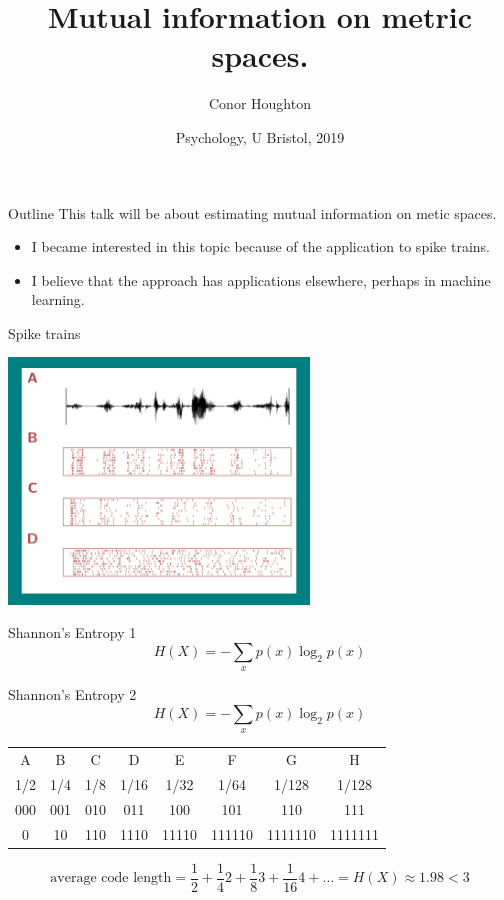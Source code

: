 \documentclass{beamer}
\title[A Kozachenko-Leonenko estimator.]{Mutual information on metric spaces.}
\author{Conor Houghton}
\institute{CS, U Bristol}
\date{Psychology, U Bristol, 2019}
\begin{document}
\maketitle

\begin{frame}{Outline}
This talk will be about estimating mutual information on metic spaces.
\begin{itemize}
\item I became interested in this topic because of the application to spike trains.
\item I believe that the approach has applications elsewhere, perhaps in machine learning.
\end{itemize}
\color{black}
\end{frame}


\begin{frame}{Spike trains}
\color{reddish}
\begin{center}
\includegraphics[width=8cm]{SpikeTrains.png}
\end{center}
\end{frame}



\begin{frame}{Shannon's Entropy 1}
\color{dark}
$$
H(X)=-\sum_x p(x)\log_2{p(x)}
$$
\color{black}
\end{frame}



\begin{frame}{Shannon's Entropy 2}
\color{dark}
$$
H(X)=-\sum_x p(x)\log_2{p(x)}
$$
\color{black}
\begin{center}
\begin{tabular}{cccccccc}
A& B& C& D& E& F& G& H\\
1/2&1/4&1/8&1/16&1/32&1/64&1/128&1/128\\
000&001&010&011&100&101&110&111\\
0&10&110&1110&11110&111110&1111110&1111111
\end{tabular}
\end{center}
\color{dark}
$$
\mbox{average code length}=\frac{1}{2}+\frac{1}{4}2+\frac{1}{8}3+\frac{1}{16}4+\ldots = H(X)\approx 1.98 < 3
$$
\color{black}
\end{frame}
\end{document}
